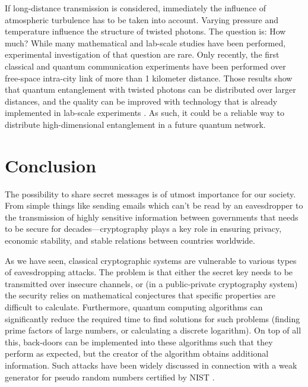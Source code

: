 \documentclass{article}
\begin{document}
If long-distance transmission is considered, immediately the influence of atmospheric turbulence has to be taken into account. Varying pressure and temperature influence the structure of twisted photons. The question is: How much? While many mathematical and lab-scale studies have been performed, experimental investigation of that question are rare. Only recently, the first classical \cite{Krenn:2014bx,lavery2015study,krenn2016twisted} and quantum communication \cite{krenn2015twisted} experiments have been performed over free-space intra-city link of more than 1 kilometer distance. Those results show that quantum entanglement with twisted photons can be distributed over larger distances, and the quality can be improved with technology that is already implemented in lab-scale experiments \cite{rodenburg2014simulating,ren2014adaptive,xie2015phase}. As such, it could be a reliable way to distribute high-dimensional entanglement in a future quantum network.


\section{Conclusion}
The possibility to share secret messages is of utmost importance for our society. From simple things like sending emails which can't be read by an eavesdropper to the transmission of highly sensitive information between governments that needs to be secure for decades---cryptography plays a key role in ensuring privacy, economic stability, and stable relations between countries worldwide.

As we have seen, classical cryptographic systems are vulnerable to various types of eavesdropping attacks. The problem is that either the secret key needs to be transmitted over insecure channels, or (in a public-private cryptography system) the security relies on mathematical conjectures that specific properties are difficult to calculate. Furthermore, quantum computing algorithms can significantly reduce the required time to find solutions for such problems (finding prime factors of large numbers, or calculating a discrete logarithm). On top of all this, back-doors can be implemented into these algorithms such that they perform as expected, but the creator of the algorithm obtains additional information. Such attacks have been widely discussed in connection with a weak generator for pseudo random numbers certified by NIST \cite{shumow2007possibility, perlroth2013government}.
\end{document}
